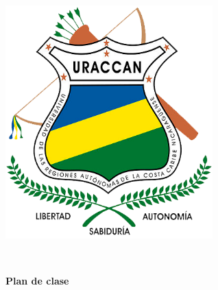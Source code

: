 \begin{titlepage}
    \centering
    \begin{minipage}{0.25\textwidth}
        \centering
        \includegraphics[width=0.6\textwidth]{images/uraccan_logo.png}
    \end{minipage}%
    \begin{minipage}{0.75\textwidth}
        \centering
        \Large{\textbf{\universidad}}\\
    \end{minipage}

    \vfill
    \large{\textbf{Plan de clase}}\\
    \Huge{\textbf{\asignatura}}\\
    \vfill
\end{titlepage}